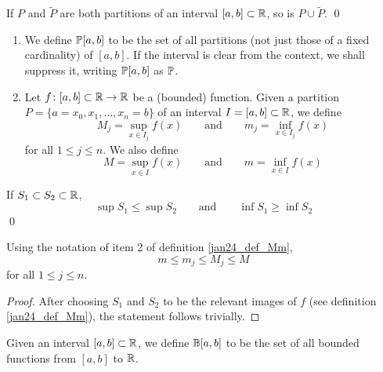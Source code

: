 \begin{claim}
  If $P$ and $\tilde{P}$ are both partitions of an interval $[a, b] \subset \mathbb{R}$, so is $P \cup \tilde{P}$. \qed
\end{claim}

\begin{defn}
  \label{jan24_def_Mm}
  \hfill
  \begin{enumerate}[label = \arabic*), itemsep = 10pt]
  \item
    We define $\mathbb{P}[a, b]$ to be the set of all partitions (not just those of a fixed cardinality) of $[a, b]$. If the interval is clear from the context, we shall suppress it, writing $\mathbb{P}[a, b]$ as $\mathbb{P}$.

  \item
    Let $f \colon [a, b] \subset \mathbb{R} \to \mathbb{R}$ be a (bounded) function.
    Given a partition $P = \{a = x_0, x_1, \dots ,x_n = b \}$ of an interval $I = [a, b] \subset \mathbb{R}$, we define
    \[
      M_j = \sup_{x \in I_j} f(x)
      \qquad
      \text{and}
      \qquad
      m_j = \inf_{x \in I_j} f(x)
    \]
    for all $1 \leq j \leq n$. We also define
    \[
      M = \sup_{x \in I} f(x)
      \qquad
      \text{and}
      \qquad
      m = \inf_{x \in I} f(x)
    \]
    
  \end{enumerate}
\end{defn}

\begin{claim}
  If $S_1 \subset S_2 \subset \mathbb{R}$,
  \[
    \sup S_1 \leq \sup S_2
    \qquad
    \text{and}
    \qquad
    \inf S_1 \geq \inf S_2
  \]
  \hfill\qed
\end{claim}

\begin{corr}
  Using the notation of item 2 of definition \ref{jan24_def_Mm},
  \[
    m \leq m_j \leq M_j \leq M
  \]
  for all $1 \leq j \leq n$.
\end{corr}

\begin{proof}
  After choosing $S_1$ and $S_2$ to be the relevant images of $f$ (see definition \ref{jan24_def_Mm}), the statement follows trivially. \hfill
\end{proof}

\begin{defn}
  Given an interval $[a, b] \subset \mathbb{R}$, we define $\mathbb{B}[a, b]$ to be the set of all bounded functions from $[a, b]$ to $\mathbb{R}$.
\end{defn}

